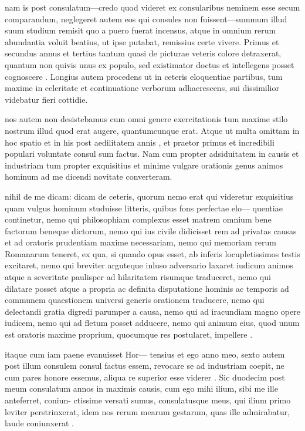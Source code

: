  nam is post consulatum—credo quod videret ex consularibus neminem esse secum comparandum, neglegeret autem eos qui consules non fuissent—summum illud suum studium remisit quo a puero fuerat incensus, atque in omnium rerum abundantia voluit beatius, ut ipse putabat, remissius certe vivere. Primus et secundus annus et tertius tantum quasi de picturae veteris colore detraxerat, quantum non quivis unus ex populo, sed existimator doctus et intellegens posset cognoscere . Longius autem procedens ut in ceteris eloquentiae partibus, tum maxime in celeritate et continuatione verborum adhaerescens, sui dissimilior videbatur fieri cottidie.

 nos autem non desistebamus cum omni genere exercitationis tum maxime stilo nostrum illud quod erat augere, quantumcunque erat. Atque ut multa omittam in hoc spatio et in his post aedilitatem annis , et praetor primus et incredibili populari voluntate consul sum factus. Nam cum propter adsiduitatem in causis et industriam tum propter exquisitius et minime vulgare orationis genus animos hominum ad me dicendi novitate converteram.

 nihil de me dicam: dicam de ceteris, quorum nemo erat qui videretur exquisitius quam vulgus hominum studuisse litteris, quibus fons perfectae elo— quentiae continetur, nemo qui philosophiam complexus esset matrem omnium bene factorum beneque dictorum, nemo qui ius civile didicisset rem ad privatas causas et ad oratoris prudentiam maxime necessariam, nemo qui memoriam rerum Romanarum teneret, ex qua, si quando opus esset, ab inferis locupletissimos testis excitaret, nemo qui breviter arguteque inluso adversario laxaret iudicum animos atque a severitate paulisper ad hilaritatem risumque traduceret, nemo qui dilatare posset atque a propria ac definita disputatione hominis ac temporis ad communem quaestionem universi generis orationem traducere, nemo qui delectandi gratia digredi parumper a causa, nemo qui ad iracundiam magno opere iudicem, nemo qui ad fletum posset adducere, nemo qui animum eius, quod unum est oratoris maxime proprium, quocumque res postularet, impellere .

 itaque cum iam paene evanuisset Hor— tensius et ego anno meo, sexto autem post illum consulem consul factus essem, revocare se ad industriam coepit, ne cum pares honore essemus, aliqua re superior esse viderer . Sic duodecim post meum consulatum annos in maximis causis, cum ego mihi ilium, sibi me ille anteferret, coniun- ctissime versati sumus, consulatusque meus, qui ilium primo leviter perstrinxerat, idem nos rerum mearum gestarum, quas ille admirabatur, laude coniunxerat .

